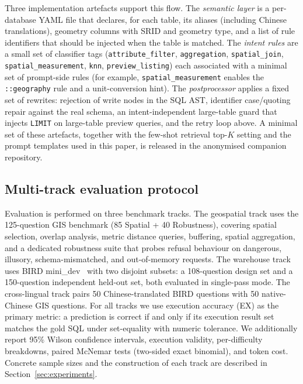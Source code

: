 \documentclass[11pt]{article}
\begin{document}
Three implementation artefacts support this flow. The \emph{semantic layer} is a per-database YAML file that declares, for each table, its aliases (including Chinese translations), geometry columns with SRID and geometry type, and a list of rule identifiers that should be injected when the table is matched. The \emph{intent rules} are a small set of classifier tags (\texttt{attribute\_filter}, \texttt{aggregation}, \texttt{spatial\_join}, \texttt{spatial\_measurement}, \texttt{knn}, \texttt{preview\_listing}) each associated with a minimal set of prompt-side rules (for example, \texttt{spatial\_measurement} enables the \texttt{::geography} rule and a unit-conversion hint). The \emph{postprocessor} applies a fixed set of rewrites: rejection of write nodes in the SQL AST, identifier case/quoting repair against the real schema, an intent-independent large-table guard that injects \texttt{LIMIT} on large-table preview queries, and the retry loop above. A minimal set of these artefacts, together with the few-shot retrieval top-$K$ setting and the prompt templates used in this paper, is released in the anonymised companion repository.

\subsection{Multi-track evaluation protocol}

Evaluation is performed on three benchmark tracks. The geospatial track uses the 125-question GIS benchmark (85 Spatial + 40 Robustness), covering spatial selection, overlap analysis, metric distance queries, buffering, spatial aggregation, and a dedicated robustness suite that probes refusal behaviour on dangerous, illusory, schema-mismatched, and out-of-memory requests. The warehouse track uses BIRD mini\_dev~\cite{li2023bird} with two disjoint subsets: a 108-question design set and a 150-question independent held-out set, both evaluated in single-pass mode. The cross-lingual track pairs 50 Chinese-translated BIRD questions with 50 native-Chinese GIS questions. For all tracks we use execution accuracy (EX) as the primary metric: a prediction is correct if and only if its execution result set matches the gold SQL under set-equality with numeric tolerance. We additionally report 95\% Wilson confidence intervals, execution validity, per-difficulty breakdowns, paired McNemar tests (two-sided exact binomial), and token cost. Concrete sample sizes and the construction of each track are described in Section~\ref{sec:experiments}.
\end{document}
